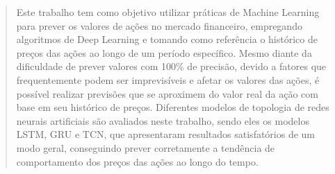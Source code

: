 
\begin{abstract}
Este trabalho tem como objetivo utilizar práticas de Machine Learning para prever os valores de ações no mercado financeiro, empregando algoritmos de Deep Learning e tomando como referência o histórico de preços das ações ao longo de um período específico. Mesmo diante da dificuldade de prever valores com 100\% de precisão, devido a fatores que frequentemente podem ser imprevisíveis e afetar os valores das ações, é possível realizar previsões que se aproximem do valor real da ação com base em seu histórico de preços. Diferentes modelos de topologia de redes neurais artificiais são avaliados neste trabalho, sendo eles os modelos LSTM, GRU e TCN, que apresentaram resultados satisfatórios de um modo geral, conseguindo prever corretamente a tendência de comportamento dos preços das ações ao longo do tempo.
\end{abstract}